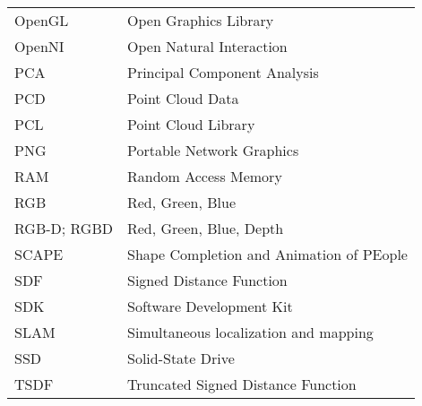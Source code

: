 \begin{longtable}{@{}p{}p{}@{}}
     OpenGL & Open Graphics Library \\
     OpenNI & Open Natural Interaction \\
        PCA & Principal Component Analysis \\
        PCD & Point Cloud Data \\
        PCL & Point Cloud Library \\
        PNG & Portable Network Graphics \\
        RAM & Random Access Memory \\
        RGB & Red, Green, Blue \\
RGB-D; RGBD & Red, Green, Blue, Depth \\
      SCAPE & Shape Completion and Animation of PEople \\
        SDF & Signed Distance Function \\
        SDK & Software Development Kit \\
       SLAM & Simultaneous localization and mapping \\
        SSD & Solid-State Drive \\
       TSDF & Truncated Signed Distance Function \\
\end{longtable}

